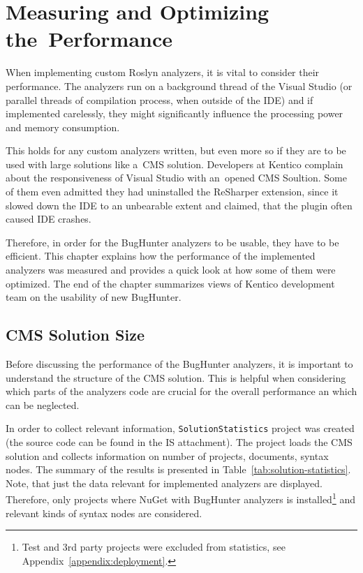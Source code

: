 \documentclass[
  digital, %
  table,   %
  lof,     %
  lot,     %
  oneside,
]{fithesis3}
\begin{document}
\chapter{Measuring and Optimizing the~Performance}
\label{chap:performance}
When implementing custom Roslyn analyzers, it is vital to consider their performance. The analyzers run on a background thread of the Visual Studio (or parallel threads of compilation process, when outside of the IDE) and if implemented carelessly, they might significantly influence the processing power and memory consumption.

This holds for any custom analyzers written, but even more so if they are to be used with large solutions like a~CMS solution. Developers at Kentico complain about the responsiveness of Visual Studio with an~opened CMS Soultion. Some of them even admitted they had uninstalled the ReSharper extension, since it slowed down the IDE to an unbearable extent and claimed, that the plugin often caused IDE crashes. 

Therefore, in order for the BugHunter analyzers to be usable, they have to be efficient. This chapter explains how the performance of the implemented analyzers was measured and provides a quick look at how some of them were optimized. The end of the chapter summarizes views of Kentico development team on the usability of new BugHunter.

\section{CMS Solution Size}
Before discussing the performance of the BugHunter analyzers, it is important to understand the structure of the CMS solution. This is helpful when considering which parts of the analyzers code are crucial for the overall performance an which can be neglected.

In order to collect relevant information, \texttt{SolutionStatistics} project was created (the source code can be found in the IS attachment). The project loads the CMS solution and collects information on number of projects, documents, syntax nodes. The summary of the results is presented in Table~\ref{tab:solution-statistics}. Note, that just the data relevant for implemented analyzers are displayed. Therefore, only projects where NuGet with BugHunter analyzers is installed\footnote{Test and 3rd party projects were excluded from statistics, see Appendix~\ref{appendix:deployment}.} and relevant kinds of syntax nodes are considered.
\end{document}
